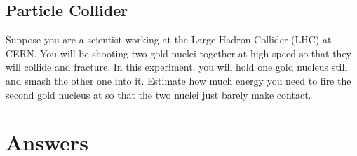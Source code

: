 \documentclass[11pt]{article}
\begin{document}
\subsection{Particle Collider}
Suppose you are a scientist working at the Large Hadron Collider (LHC) at CERN.  You will be shooting two gold nuclei together at high speed so that they will collide and fracture.  In this experiment, you will hold one gold nucleus still and smash the other one into it.  Estimate how much energy you need to fire the second gold nucleus at so that the two nuclei just barely make contact.


\pagebreak
\section{Answers}
\hspace{1cm}
\end{document}
